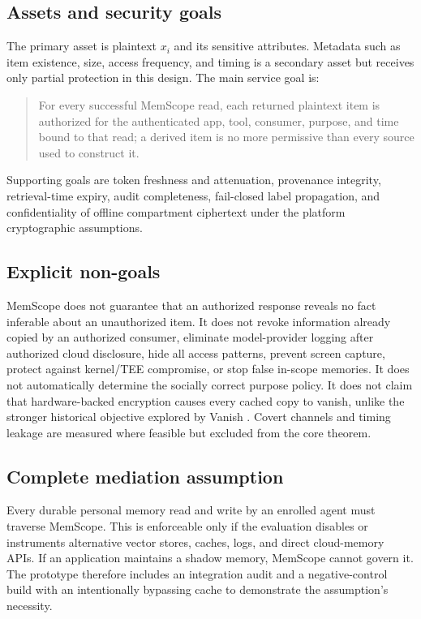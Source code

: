 

\subsection{Assets and security goals}

The primary asset is plaintext $x_i$ and its sensitive attributes. Metadata such as item existence, size, access frequency, and timing is a secondary asset but receives only partial protection in this design. The main service goal is:

\begin{quote}
For every successful MemScope read, each returned plaintext item is authorized for the authenticated app, tool, consumer, purpose, and time bound to that read; a derived item is no more permissive than every source used to construct it.
\end{quote}

Supporting goals are token freshness and attenuation, provenance integrity, retrieval-time expiry, audit completeness, fail-closed label propagation, and confidentiality of offline compartment ciphertext under the platform cryptographic assumptions.

\subsection{Explicit non-goals}

MemScope does not guarantee that an authorized response reveals no fact inferable about an unauthorized item. It does not revoke information already copied by an authorized consumer, eliminate model-provider logging after authorized cloud disclosure, hide all access patterns, prevent screen capture, protect against kernel/TEE compromise, or stop false in-scope memories. It does not automatically determine the socially correct purpose policy. It does not claim that hardware-backed encryption causes every cached copy to vanish, unlike the stronger historical objective explored by Vanish \citep{geambasu2009vanish}. Covert channels and timing leakage are measured where feasible but excluded from the core theorem.

\subsection{Complete mediation assumption}

Every durable personal memory read and write by an enrolled agent must traverse MemScope. This is enforceable only if the evaluation disables or instruments alternative vector stores, caches, logs, and direct cloud-memory APIs. If an application maintains a shadow memory, MemScope cannot govern it. The prototype therefore includes an integration audit and a negative-control build with an intentionally bypassing cache to demonstrate the assumption's necessity.
